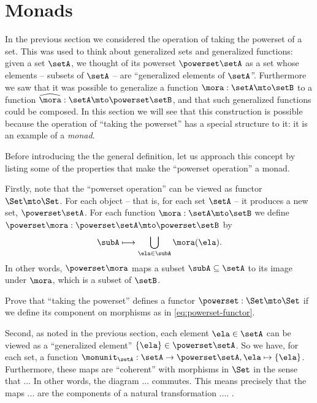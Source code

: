 

\section{Monads}
\label{sec:monads}

In the previous section we considered the operation of taking the powerset of a set. This was used to think about generalized sets and generalized functions: given a set $\setA$, we thought of its powerset $\powerset \setA$ as a set whose elements -- subsets of $\setA$ -- are ``generalized elements of $\setA$''. Furthermore we saw that it was possible to generalize a function $\mora : \setA \mto \setB$ to a function $\widehat \mora:  \setA \mto \powerset \setB$, and that such generalized functions could be composed. In this section we will see that this construction is possible because the operation of ``taking the powerset'' has a special structure to it: it is an example of a \emph{monad}.

Before introducing the the general definition, let us approach this concept by listing some of the properties that make the ``powerset operation''  a monad.

Firstly, note that the ``powerset operation'' can be viewed as functor $\Set \mto \Set$. For each object -- that is, for each set $\setA$ -- it produces a new set, $\powerset \setA$. For each function $\mora: \setA \mto \setB$ we define $\powerset \mora : \powerset \setA \mto \powerset \setB$ by
\begin{equation}\label{eq:powerset-functor}
 \subA \longmapsto \bigcup_{\ela \in \subA} \mora(\ela).
\end{equation}
In other words, $\powerset \mora$ maps a subset $\subA \subseteq \setA$ to its image under $\mora$, which is a subset of $\setB$.


\begin{gradedexercise}\label{ex:PowersetImageFunctor}
Prove that ``taking the powerset'' defines a functor $\powerset : \Set \mto \Set$ if we define its component on morphisms as in \cref{eq:powerset-functor}.
\end{gradedexercise}


Second, as noted in the previous section, each element $\ela \in \setA$ can be viewed as a ``generalized element'' $\{ \ela \} \in \powerset \setA$. So we have, for each set, a function $\monunit_\setA : \setA \to \powerset \setA, \ela \mapsto \{ \ela \}$.
Furthermore, these maps are ``coherent'' with morphisms in $\Set$ in the sense that ...  In other words, the diagram ... commutes. This means precisely that the maps ... are the components of a natural transformation .... .

